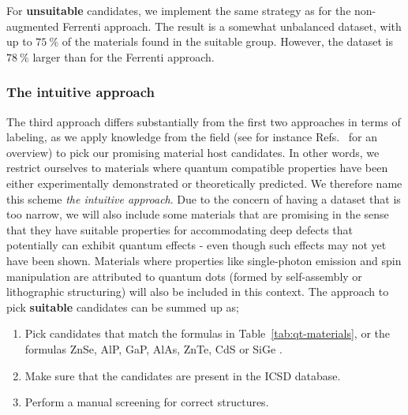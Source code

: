 \documentclass[superscriptaddress,unsortedaddress,
 amsmath,amssymb,
 aps,
]{revtex4-2}
\begin{document}
For \textbf{unsuitable} candidates, we implement the same strategy as for the non-augmented Ferrenti approach. The result is a somewhat unbalanced dataset, with up to $75 \ \%$ of the 
materials found in the suitable group. However, the dataset is $78 \ \%$ larger than for the Ferrenti approach.

\subsubsection*{The intuitive approach}
The third approach differs substantially from the first two approaches in terms of labeling, as we apply knowledge from the field (see for instance Refs.~\cite{Atatuere2018,Zhang2020,Son2020,Toth2019,Bathen2021} for an overview)   
to pick our promising material host candidates. 
In other words, we restrict ourselves to materials where quantum compatible properties have been either experimentally demonstrated or theoretically predicted. 
We therefore name this scheme \emph{the intuitive approach}. Due to the concern of having a dataset that is too narrow, we will also include some  materials that are promising in the sense that they have suitable properties for accommodating  deep defects that potentially can exhibit quantum effects - even though such effects may not yet have been shown. 
Materials where properties like single-photon emission and spin manipulation are attributed to quantum dots (formed by self-assembly or lithographic structuring) will also be included in this context.  
The approach to pick \textbf{suitable} candidates can be summed up as;   
\begin{enumerate}
    \item Pick candidates that match the formulas in Table~\ref{tab:qt-materials}, or the formulas ZnSe, AlP, GaP, AlAs, ZnTe, CdS \cite{Weber2010} or SiGe \cite{Hardy2019}. 
    \item Make sure that the candidates are present in the ICSD database.  
    \item Perform a manual screening for correct structures. 
\end{enumerate}
\end{document}
